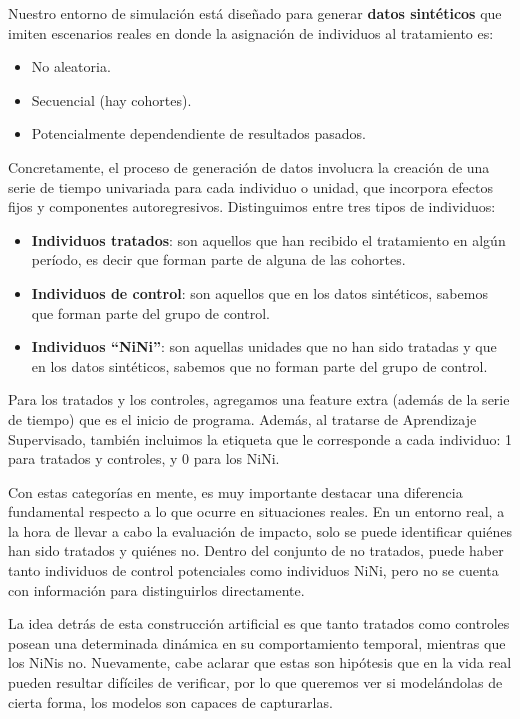 \documentclass[../../main.tex]{subfiles}
\begin{document}
Nuestro entorno de simulación está diseñado para generar \textbf{datos sintéticos} que
imiten escenarios reales en donde la asignación de individuos al tratamiento es:
\begin{itemize}[itemsep=0.05cm]
    \item No aleatoria.
    \item Secuencial (hay cohortes).
    \item Potencialmente dependendiente de resultados pasados.
\end{itemize}

Concretamente, el proceso de generación de datos involucra la creación de una serie de
tiempo univariada para cada individuo o unidad, que incorpora efectos fijos y componentes
autoregresivos. Distinguimos entre tres tipos de individuos:
\begin{itemize}[itemsep=0.1cm]
    \item \textbf{Individuos tratados}: son aquellos que han recibido el tratamiento en
    algún período, es decir que forman parte de alguna de las cohortes.
    \item \textbf{Individuos de control}: son aquellos que en los datos sintéticos,
    sabemos que forman parte del grupo de control.
    \item \textbf{Individuos ``NiNi''}: son aquellas unidades que no han sido tratadas y
    que en los datos sintéticos, sabemos que no forman parte del grupo de control.
\end{itemize}

Para los tratados y los controles, agregamos una feature extra (además de la serie de
tiempo) que es el inicio de programa. Además, al tratarse de Aprendizaje Supervisado,
también incluimos la etiqueta que le corresponde a cada individuo: 1 para tratados y
controles, y 0 para los NiNi.

Con estas categorías en mente, es muy importante destacar una diferencia fundamental
respecto a lo que ocurre en situaciones reales. En un entorno real, a la hora de llevar a
cabo la evaluación de impacto, solo se puede identificar quiénes han sido tratados y
quiénes no. Dentro del conjunto de no tratados, puede haber tanto individuos de control
potenciales como individuos NiNi, pero no se cuenta con información para distinguirlos
directamente.

La idea detrás de esta construcción artificial es que tanto tratados como controles
posean una determinada dinámica en su comportamiento temporal, mientras que los NiNis
no. Nuevamente, cabe aclarar que estas son hipótesis que en la vida real pueden resultar
difíciles de verificar, por lo que queremos ver si modelándolas de cierta forma, los
modelos son capaces de capturarlas.
\end{document}
